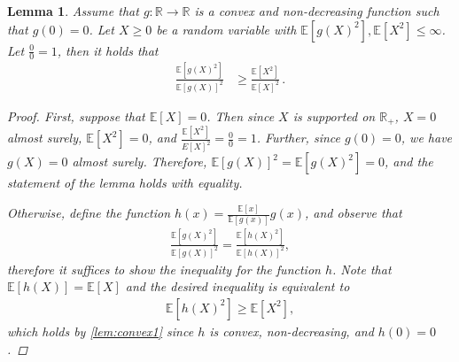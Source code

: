\documentclass[letter, 12pt]{report}
\newcommand{\R}{\mathbb R}
\newcommand{\E}{\mathbb E}
\newcommand{\1}{\mathbf{1}}
\theoremstyle{plain}
\newtheorem{lemma}[theorem]{Lemma}
\theoremstyle{definition}
\theoremstyle{remark}
\begin{document}
\begin{lemma}
    \label{lem:concave}
    Assume that $g: \R \to \R$ is a convex and non-decreasing function such that $g(0) = 0$.
    Let $X \geq 0$ be a random variable with $\E[g(X)^2], \E[X^2] \leq \infty$.
    Let $\tfrac{0}{0} = 1$, then it holds that
    \begin{align*}
        \frac{
            \E[g(X)^2]
        }{
            \E[g(X)]^2
        }
         & \geq
        \frac{
            \E[X^2]
        }{
            \E[X]^2
        }\,.
    \end{align*}
    \begin{proof}
        First, suppose that $\E[X]=0$.
        Then since $X$ is supported on $\R_+$, $X=0$ almost surely,
        $\E[X^2]=0$, and $\tfrac{\E[X^2]}{E[X]^2} = \tfrac{0}{0} = 1$.
        Further, since $g(0)=0$, we have $g(X)=0$ almost surely.
        Therefore, $\E[g(X)]^2 = \E[g(X)^2] = 0$,
        and the statement of the lemma holds with equality.

        Otherwise, define the function
        $h(x) = \frac{\E[x]}{\E[g(x)]}g(x)$,
        and observe that
        \begin{align*}
            \frac{
                \E[g(X)^2]
            }{
                \E[g(X)]^2
            }
            =
            \frac{
                \E[h(X)^2]
            }{
                \E[h(X)]^2
            },
        \end{align*}
        therefore it suffices to show the inequality
        for the function $h$.
        Note that $\E[h(X)] = \E[X]$
        and the desired inequality is equivalent to
        \begin{align*}
            \E[h(X)^2]
            \geq
            \E[X^2],
        \end{align*}
        which holds by \cref{lem:convex1} since $h$ is convex, non-decreasing, and $h(0)=0$.
    \end{proof}
\end{lemma}
\end{document}
